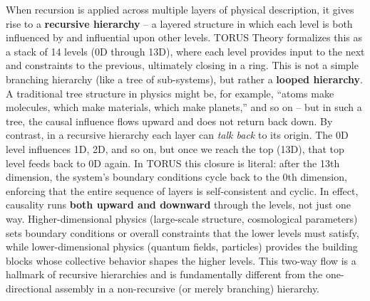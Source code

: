 \documentclass[
]{article}
\begin{document}
When recursion is applied across multiple layers of physical
description, it gives rise to a \textbf{recursive hierarchy} -- a
layered structure in which each level is both influenced by and
influential upon other levels. TORUS Theory formalizes this as a stack
of 14 levels (0D through 13D), where each level provides input to the
next and constraints to the previous, ultimately closing in a ring. This
is not a simple branching hierarchy (like a tree of sub-systems), but
rather a \textbf{looped hierarchy}. A traditional tree structure in
physics might be, for example, ``atoms make molecules, which make
materials, which make planets,'' and so on -- but in such a tree, the
causal influence flows upward and does not return back down. By
contrast, in a recursive hierarchy each layer can \emph{talk back} to
its origin. The 0D level influences 1D, 2D, and so on, but once we reach
the top (13D), that top level feeds back to 0D again\hspace{0pt}. In
TORUS this closure is literal: after the 13th dimension, the system's
boundary conditions cycle back to the 0th dimension, enforcing that the
entire sequence of layers is self-consistent and cyclic. In effect,
causality runs \textbf{both upward and downward} through the levels, not
just one way. Higher-dimensional physics (large-scale structure,
cosmological parameters) sets boundary conditions or overall constraints
that the lower levels must satisfy, while lower-dimensional physics
(quantum fields, particles) provides the building blocks whose
collective behavior shapes the higher levels. This two-way flow is a
hallmark of recursive hierarchies and is fundamentally different from
the one-directional assembly in a non-recursive (or merely branching)
hierarchy.
\end{document}
